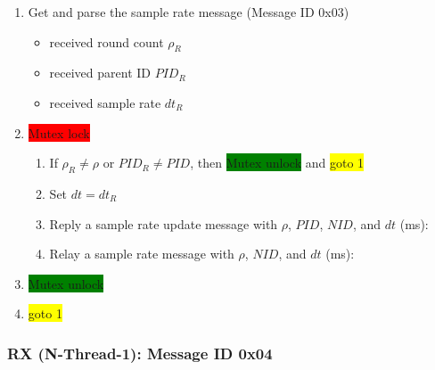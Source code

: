 \documentclass[letterpaper,10pt]{article}
\begin{document}
\begin{enumerate}
	\item Get and parse the sample rate message (Message ID 0x03)
	\begin{itemize}
		\item received round count $\rho_R$
		\item received parent ID $PID_R$
		\item received sample rate $dt_R$
	\end{itemize}
	\item \colorbox{red}{Mutex lock}
	\begin{enumerate}
		\item If $\rho_R \neq \rho$ or $PID_R \neq PID$, then \colorbox{green}{Mutex unlock} and \colorbox{yellow}{goto 1}
		\item Set $dt=dt_R$
		\item Reply a sample rate update message with $\rho$, $PID$, $NID$, and $dt$ (ms):\\
		\item Relay a sample rate message with $\rho$, $NID$, and $dt$ (ms):\\
	\end{enumerate}
	\item \colorbox{green}{Mutex unlock}
	\item \colorbox{yellow}{goto 1}
\end{enumerate}

\subsubsection{RX (N-Thread-1): Message ID 0x04}
\end{document}
